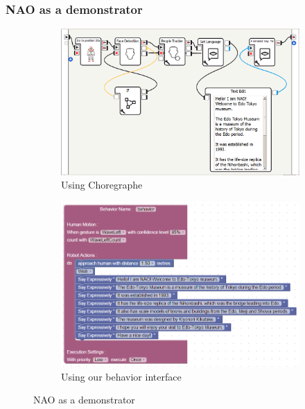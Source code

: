 \documentclass{llncs}
\begin{document}
\subsubsection{NAO as a demonstrator}%
\begin{figure}
\centering
\begin{subfigure}[t]{0.49\textwidth}
\includegraphics[width=\textwidth]{../thesis/assets/scenario_museum_choregraphe2.png}
\caption[NAO as demonstrator]{Using Choregraphe}
\label{fig:scenario1_program_choregraphe}
\end{subfigure}
\begin{subfigure}[t]{0.49\textwidth}
\includegraphics[width=\textwidth]{../thesis/assets/scenario1.png}
\caption[NAO as therapy facilitator]{Using our behavior interface}
\label{fig:scenario1_program}
\end{subfigure}
\caption[NAO as a demonstrator]{NAO as a demonstrator}
\label{fig:scenarios}
\end{figure}
\end{document}
